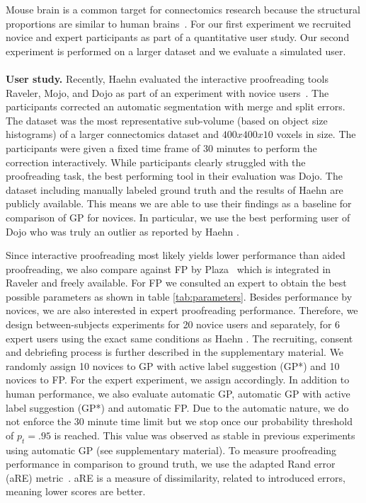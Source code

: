 Mouse brain is a common target for connectomics research because the structural proportions are similar to human brains~\cite{jeff_science}. For our first experiment we recruited novice and expert participants as part of a quantitative user study. Our second experiment is performed on a larger dataset and we evaluate a simulated user.
\\~\\
\textbf{User study.} Recently, Haehn \etal evaluated the interactive proofreading tools Raveler, Mojo, and Dojo as part of an experiment with novice users~\cite{haehn_dojo_2014}. The participants corrected an automatic segmentation with merge and split errors. The dataset was the most representative sub-volume (based on object size histograms) of a larger connectomics dataset and $400x400x10$ voxels in size. The participants were given a fixed time frame of 30 minutes to perform the correction interactively. While participants clearly struggled with the proofreading task, the best performing tool in their evaluation was Dojo. The dataset including manually labeled ground truth and the results of Haehn \etal are publicly available. This means we are able to use their findings as a baseline for comparison of GP for novices. In particular, we use the best performing user of Dojo who was truly an outlier as reported by Haehn \etal.

Since interactive proofreading most likely yields lower performance than aided proofreading, we also compare against FP by Plaza~\cite{focused_proofreading} which is integrated in Raveler and freely available. For FP we consulted an expert to obtain the best possible parameters as shown in table \ref{tab:parameters}. Besides performance by novices, we are also interested in expert proofreading performance. Therefore, we design between-subjects experiments for 20 novice users and separately, for 6 expert users using the exact same conditions as Haehn \etal. The recruiting, consent and debriefing process is further described in the supplementary material. We randomly assign 10 novices to GP with active label suggestion (GP*) and 10 novices to FP. For the expert experiment, we assign accordingly.
In addition to human performance, we also evaluate automatic GP, automatic GP with active label suggestion (GP*) and automatic FP. Due to the automatic nature, we do not enforce the 30 minute time limit but we stop once our probability threshold of $p_t=.95$ is reached. This value was observed as stable in previous experiments using automatic GP (see supplementary material). To measure proofreading performance in comparison to ground truth, we use the adapted Rand error (aRE) metric~\cite{RAND}. aRE is a measure of dissimilarity, related to introduced errors, meaning lower scores are better. 

